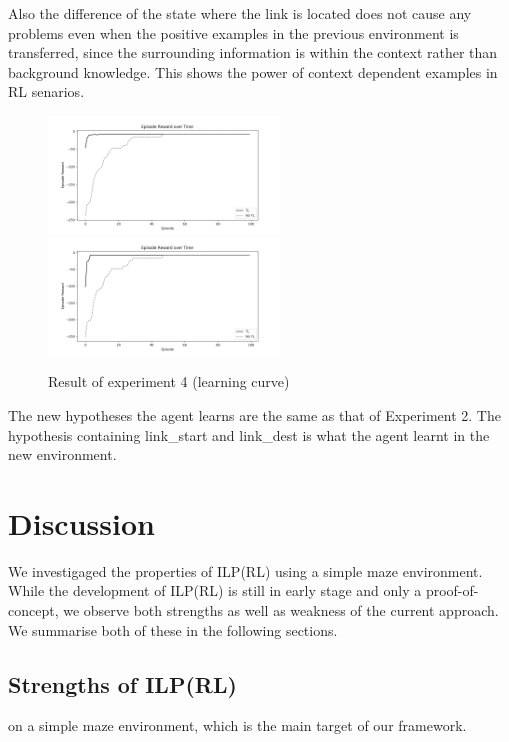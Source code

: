 Also the difference of the state where the link is located does not cause any problems even when the positive examples in the previous environment is transferred, since the surrounding information is within the context rather than background knowledge. 
This shows the power of context dependent examples in RL senarios.

\begin{figure}[!htb]
\centerline{
\includegraphics[width=0.55\textwidth]{./figures/experiment4_training}
\includegraphics[width=0.55\textwidth]{./figures/experiment4_test}
}
\caption{Result of experiment 4 (learning curve)}
\label{experiment4_training_test}
\end{figure}

The new hypotheses the agent learns are the same as that of Experiment 2. The hypothesis containing \textsf{link\_start} and \textsf{link\_dest} is what the agent learnt in the new environment.



\clearpage

\section{Discussion}
\label{sec:discussion}

We investigaged the properties of ILP(RL) using a simple maze environment. While the development of ILP(RL) is still in early stage and only a proof-of-concept, 
we observe both strengths as well as weakness of the current approach. We summarise both of these in the following sections.

\subsection{Strengths of ILP(RL)}
on a simple maze environment, which is the main target of our framework.


